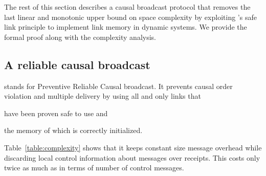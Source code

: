 
The rest of this section describes a causal broadcast protocol that removes the
last linear and monotonic upper bound on space complexity by exploiting
\PCBROADCAST's safe link principle to implement link memory in dynamic systems.
We provide the formal proof along with the complexity analysis.


\subsection{A reliable causal broadcast}

\RPCBROADCAST stands for Preventive Reliable Causal broadcast. It prevents
causal order violation and multiple delivery by using all and only links that
\begin{inparaenum}[(i)]
\item have been proven safe to use and
\item the memory of which is correctly initialized.
\end{inparaenum}
Table~\ref{table:complexity} shows that it keeps constant size message overhead
while discarding local control information about messages over receipts. This
costs only twice as much as \PCBROADCAST in terms of number of control messages.



